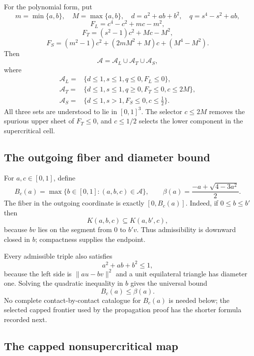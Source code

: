 For the polynomial form, put
\[
 m=\min\{a,b\},\quad M=\max\{a,b\},\quad
 d=a^2+ab+b^2,
 \quad q=s^4-s^2+ab,
\]
\[
 F_L=c^4-c^2+mc-m^2,
\]
\[
 F_T=(s^2-1)c^2+Mc-M^2,
\]
\[
 F_S=(m^2-1)c^2+(2mM^2+M)c+(M^4-M^2).
\]
Then
\begin{equation}
 \mathcal A=\mathcal A_L\cup\mathcal A_T\cup\mathcal A_S,
 \label{eq:admissible-cells}
\end{equation}
where
\[
 \begin{aligned}
 \mathcal A_L={}&\{d\le1, s\le1, q\le0, F_L\le0\},\\
 \mathcal A_T={}&\{d\le1, s\le1, q\ge0, F_T\le0, c\le2M\},\\
 \mathcal A_S={}&\{d\le1, s>1, F_S\le0, c\le\tfrac12\}.
 \end{aligned}
\]
All three sets are understood to lie in $[0,1]^3$.  The selector
$c\le2M$ removes the spurious upper sheet of $F_T\le0$, and
$c\le1/2$ selects the lower component in the supercritical cell.

\subsection{The outgoing fiber and diameter bound}

For $a,c\in[0,1]$, define
\[
 B_c(a)=\max\{b\in[0,1]:(a,b,c)\in\mathcal A\},
 \qquad
 \beta(a)=\frac{-a+\sqrt{4-3a^2}}2.
\]
The fiber in the outgoing coordinate is exactly $[0,B_c(a)]$.  Indeed, if
$0\le b\le b'$ then
\[
 K(a,b,c)\subseteq K(a,b',c),
\]
because $bv$ lies on the segment from $0$ to $b'v$.  Thus admissibility is
downward closed in $b$; compactness supplies the endpoint.

Every admissible triple also satisfies
\[
 a^2+ab+b^2\le1,
\]
because the left side is $\lVert au-bv\rVert^2$ and a unit equilateral
triangle has diameter one.  Solving the quadratic inequality in $b$ gives the
universal bound
\begin{equation}
 B_c(a)\le\beta(a).
 \label{eq:outgoing-diameter-bound}
\end{equation}
No complete contact-by-contact catalogue for $B_c(a)$ is needed below; the
selected capped frontier used by the propagation proof has the shorter formula
recorded next.

\subsection{The capped nonsupercritical map}

